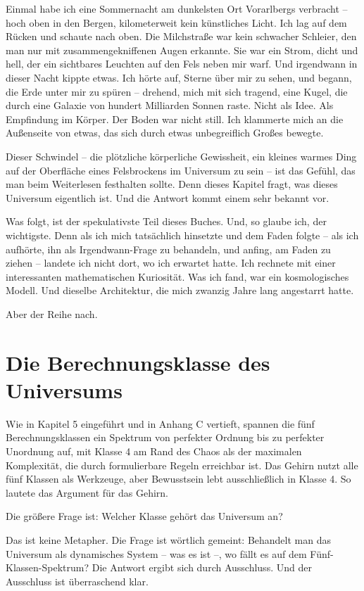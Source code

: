 \documentclass[11pt, twoside, openright]{book}
\begin{document}
Einmal habe ich eine Sommernacht am dunkelsten Ort Vorarlbergs verbracht -- hoch oben in den Bergen, kilometerweit kein künstliches Licht. Ich lag auf dem Rücken und schaute nach oben. Die Milchstraße war kein schwacher Schleier, den man nur mit zusammengekniffenen Augen erkannte. Sie war ein Strom, dicht und hell, der ein sichtbares Leuchten auf den Fels neben mir warf. Und irgendwann in dieser Nacht kippte etwas. Ich hörte auf, Sterne über mir zu sehen, und begann, die Erde unter mir zu spüren -- drehend, mich mit sich tragend, eine Kugel, die durch eine Galaxie von hundert Milliarden Sonnen raste. Nicht als Idee. Als Empfindung im Körper. Der Boden war nicht still. Ich klammerte mich an die Außenseite von etwas, das sich durch etwas unbegreiflich Großes bewegte.

Dieser Schwindel -- die plötzliche körperliche Gewissheit, ein kleines warmes Ding auf der Oberfläche eines Felsbrockens im Universum zu sein -- ist das Gefühl, das man beim Weiterlesen festhalten sollte. Denn dieses Kapitel fragt, was dieses Universum eigentlich ist. Und die Antwort kommt einem sehr bekannt vor.


Was folgt, ist der spekulativste Teil dieses Buches. Und, so glaube ich, der wichtigste. Denn als ich mich tatsächlich hinsetzte und dem Faden folgte -- als ich aufhörte, ihn als Irgendwann-Frage zu behandeln, und anfing, am Faden zu ziehen -- landete ich nicht dort, wo ich erwartet hatte. Ich rechnete mit einer interessanten mathematischen Kuriosität. Was ich fand, war ein kosmologisches Modell. Und dieselbe Architektur, die mich zwanzig Jahre lang angestarrt hatte.

Aber der Reihe nach.


\section*{Die Berechnungsklasse des Universums}

Wie in Kapitel 5 eingeführt und in Anhang C vertieft, spannen die fünf Berechnungsklassen ein Spektrum von perfekter Ordnung bis zu perfekter Unordnung auf, mit Klasse 4 am Rand des Chaos als der maximalen Komplexität, die durch formulierbare Regeln erreichbar ist. Das Gehirn nutzt alle fünf Klassen als Werkzeuge, aber Bewusstsein lebt ausschließlich in Klasse 4. So lautete das Argument für das Gehirn.

Die größere Frage ist: Welcher Klasse gehört das Universum an?

Das ist keine Metapher. Die Frage ist wörtlich gemeint: Behandelt man das Universum als dynamisches System -- was es ist --, wo fällt es auf dem Fünf-Klassen-Spektrum? Die Antwort ergibt sich durch Ausschluss. Und der Ausschluss ist überraschend klar.
\end{document}
